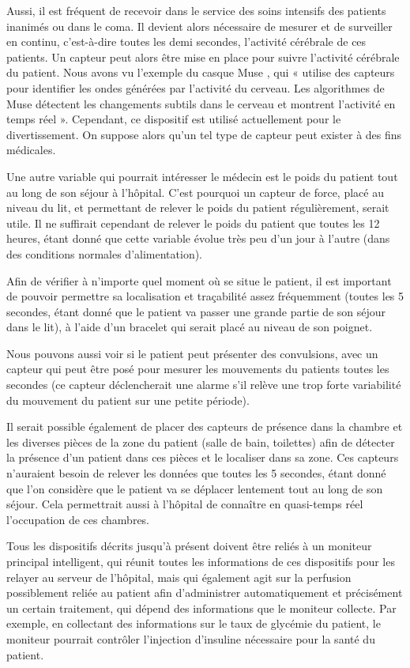 \documentclass{article}
\begin{document}
Aussi, il est fréquent de recevoir dans le service des soins intensifs des patients inanimés ou dans le coma. Il devient alors nécessaire de mesurer et de surveiller en continu, c’est-à-dire toutes les demi secondes, l’activité cérébrale de ces patients. Un capteur peut alors être mise en place pour suivre l’activité cérébrale du patient. Nous avons vu l’exemple du casque Muse \cite{Muse}, qui « utilise des capteurs pour identifier les ondes générées par l’activité du cerveau. Les algorithmes de Muse détectent les changements subtils dans le cerveau et montrent l’activité en temps réel ». Cependant, ce dispositif est utilisé actuellement pour le divertissement. On suppose alors qu’un tel type de capteur peut exister à des fins médicales.

Une autre variable qui pourrait intéresser le médecin est le poids du patient tout au long de son séjour à l’hôpital. C’est pourquoi un capteur de force, placé au niveau du lit, et permettant de relever le poids du patient régulièrement, serait utile. Il ne suffirait cependant de relever le poids du patient que toutes les 12 heures, étant donné que cette variable évolue très peu d’un jour à l'autre (dans des conditions normales d'alimentation).

Afin de vérifier à n’importe quel moment où se situe le patient, il est important de pouvoir permettre sa localisation et traçabilité \cite{Localisation} assez fréquemment (toutes les 5 secondes, étant donné que le patient va passer une grande partie de son séjour dans le lit), à l’aide d’un bracelet qui serait placé au niveau de son poignet. 

Nous pouvons aussi voir si le patient peut présenter des convulsions, avec un capteur \cite{Convulsion} qui peut être posé pour mesurer les mouvements du patients toutes les secondes (ce capteur déclencherait une alarme s’il relève une trop forte variabilité du mouvement du patient sur une petite période). 

Il serait possible également de placer des capteurs de présence dans la chambre et les diverses pièces de la zone du patient (salle de bain, toilettes) afin de détecter la présence d’un patient dans ces pièces et le localiser dans sa zone. Ces capteurs n’auraient besoin de relever les données que toutes les 5 secondes, étant donné que l’on considère que le patient va se déplacer lentement tout au long de son séjour. Cela permettrait aussi à l’hôpital de connaître en quasi-temps réel l’occupation de ces chambres.

Tous les dispositifs décrits jusqu’à présent doivent être reliés à un moniteur principal intelligent, qui réunit toutes les informations de ces dispositifs pour les relayer au serveur de l’hôpital, mais qui également agit sur la perfusion possiblement reliée au patient afin d’administrer automatiquement et précisément un certain traitement, qui dépend des informations que le moniteur collecte. Par exemple, en collectant des informations sur le taux de glycémie du patient, le moniteur pourrait contrôler l’injection d’insuline nécessaire pour la santé du patient.
\end{document}
